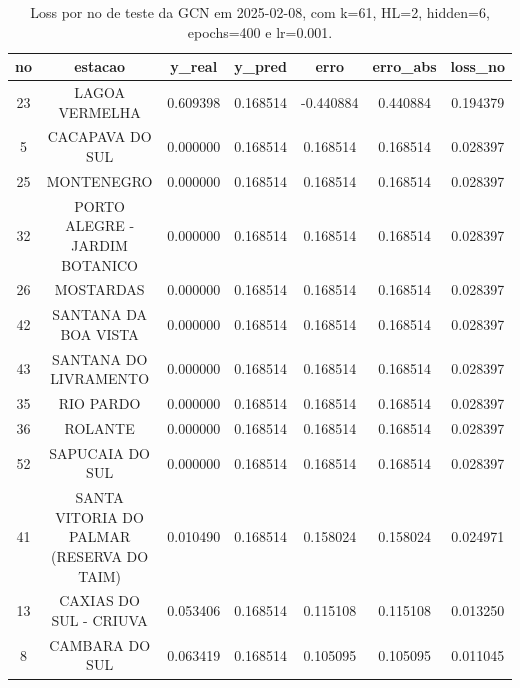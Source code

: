 \begin{table}[h]
\centering
\caption{Loss por no de teste da GCN em 2025-02-08, com k=61, HL=2, hidden=6, epochs=400 e lr=0.001.}
\label{tab:gcn_loss_k61_hl2_h6_e400_d20250208}
\begin{tabular}{ccccccc}
\toprule
no & estacao & y\_real & y\_pred & erro & erro\_abs & loss\_no \\
\midrule
23 & LAGOA VERMELHA & 0.609398 & 0.168514 & -0.440884 & 0.440884 & 0.194379 \\
5 & CACAPAVA DO SUL & 0.000000 & 0.168514 & 0.168514 & 0.168514 & 0.028397 \\
25 & MONTENEGRO & 0.000000 & 0.168514 & 0.168514 & 0.168514 & 0.028397 \\
32 & PORTO ALEGRE - JARDIM BOTANICO & 0.000000 & 0.168514 & 0.168514 & 0.168514 & 0.028397 \\
26 & MOSTARDAS & 0.000000 & 0.168514 & 0.168514 & 0.168514 & 0.028397 \\
42 & SANTANA DA BOA VISTA & 0.000000 & 0.168514 & 0.168514 & 0.168514 & 0.028397 \\
43 & SANTANA DO LIVRAMENTO & 0.000000 & 0.168514 & 0.168514 & 0.168514 & 0.028397 \\
35 & RIO PARDO & 0.000000 & 0.168514 & 0.168514 & 0.168514 & 0.028397 \\
36 & ROLANTE & 0.000000 & 0.168514 & 0.168514 & 0.168514 & 0.028397 \\
52 & SAPUCAIA DO SUL & 0.000000 & 0.168514 & 0.168514 & 0.168514 & 0.028397 \\
41 & SANTA VITORIA DO PALMAR (RESERVA DO TAIM) & 0.010490 & 0.168514 & 0.158024 & 0.158024 & 0.024971 \\
13 & CAXIAS DO SUL - CRIUVA & 0.053406 & 0.168514 & 0.115108 & 0.115108 & 0.013250 \\
8 & CAMBARA DO SUL & 0.063419 & 0.168514 & 0.105095 & 0.105095 & 0.011045 \\
\bottomrule
\end{tabular}
\end{table}
